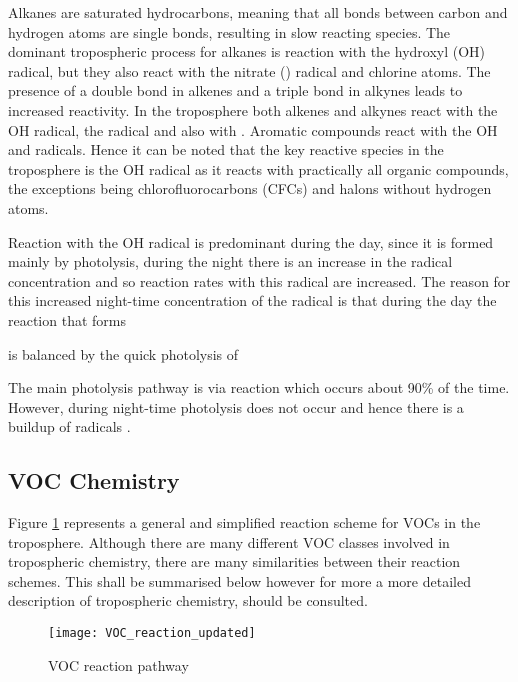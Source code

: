 Alkanes are saturated hydrocarbons, meaning that all bonds between carbon and hydrogen atoms are single bonds, resulting in slow reacting species. 
The dominant tropospheric process for alkanes is reaction with the hydroxyl (OH) radical, but they also react with the nitrate () radical and chlorine atoms. 
The presence of a double bond in alkenes and a triple bond in alkynes leads to increased reactivity. 
In the troposphere both alkenes and alkynes react with the OH radical, the  radical and also with . 
Aromatic compounds react with the OH and  radicals. 
Hence it can be noted that the key reactive species in the troposphere is the OH radical as it reacts with practically all organic compounds, the exceptions being chlorofluorocarbons (CFCs) and halons without hydrogen atoms. 

Reaction with the OH radical is predominant during the day, since it is formed mainly by photolysis, during the night there is an increase in the  radical concentration and so reaction rates with this radical are increased. 
The reason for this increased night-time concentration of the  radical is that during the day the reaction that forms  
\begin{reactionlist}
\end{reactionlist}
is balanced by the quick photolysis of 
\begin{reactionlist}
\end{reactionlist}
The main photolysis pathway is via reaction  which occurs about 90\% of the time. 
However, during night-time photolysis does not occur and hence there is a buildup of  radicals \citep{Atkinson:1990, Atkinson:2000}.

\subsection{VOC Chemistry}
Figure \ref{f:VOC_reaction} represents a general and simplified reaction scheme for VOCs in the troposphere. 
Although there are many different VOC classes involved in tropospheric chemistry, there are many similarities between their reaction schemes. 
This shall be summarised below however for more a more detailed description of tropospheric chemistry, \citep{Atkinson:2000} should be consulted. 
\begin{figure}
    \begin{center}
        \texttt{[image: VOC\_reaction\_updated]}
        \caption[what is this]{VOC reaction pathway}
        \label{f:VOC_reaction}
    \end{center}
\end{figure}

